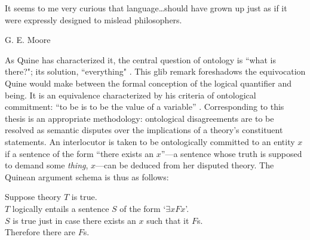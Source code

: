 \epigraph{
  It seems to me very curious that language\ldots should have grown up
  just as if it were expressly designed to mislead philosophers.}%
  {G. E. Moore \cite[p.217]{moore}}


  As Quine has characterized it, the central question of ontology is
  ``what is there?"; its solution, ``everything"
  \cite[p.1]{quine}. This glib remark foreshadows the equivocation
  Quine would make between the formal conception of the logical
  quantifier and being.  It is an equivalence characterized by his
  criteria of ontological commitment: ``to be is to be the value of a
  variable'' \cite[p.15]{quine}.  Corresponding to this
  thesis is an appropriate methodology: ontological disagreements are
  to be resolved as semantic disputes over the implications of a
  theory's constituent statements. 
  An interlocutor is taken to be
  ontologically committed to an entity $x$ if a sentence of the form
  ``there exists an $x$''---a sentence whose truth is supposed to
  demand some \emph{thing}, $x$---can be deduced from her disputed
  theory.  The Quinean argument schema is thus as follows:

\begin{te}
  Suppose theory $T$ is true.\\
  $T$ logically entails a sentence $S$ of the form `$\exists xFx$'.\\
  $S$ is true just in case there exists an $x$ such that it $F$s.\\
  Therefore there are $F$s.\\
\end{te}\label{arg1}

